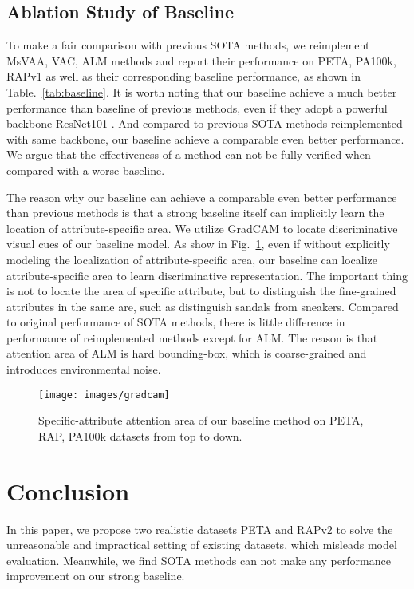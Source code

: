 \documentclass[runningheads]{llncs}
\begin{document}
\subsection{Ablation Study of Baseline}
To make a fair comparison with previous SOTA methods, we reimplement MsVAA, VAC, ALM methods and report their performance on PETA, PA100k, RAPv1 as well as their corresponding baseline performance, as shown in Table.~\ref{tab:baseline}. It is worth noting that our baseline achieve a much better performance than baseline of previous methods, even if they adopt a powerful backbone ResNet101 \cite{he2016deep}. And compared to previous SOTA methods reimplemented with same backbone, our baseline achieve a comparable even better performance. We argue that the effectiveness of a method can not be fully verified when compared with a worse baseline. 

The reason why our baseline can achieve a comparable even better performance than previous methods is that a strong baseline itself can implicitly learn the location of attribute-specific area. We utilize GradCAM \cite{selvaraju2017grad} to locate discriminative visual cues of our baseline model. As show in Fig.~\ref{fig:attention}, even if without explicitly modeling the localization of attribute-specific area, our baseline can localize attribute-specific area to learn discriminative representation. The important thing is not to locate the area of specific attribute, but to distinguish the fine-grained attributes in the same are, such as  distinguish sandals from sneakers. Compared to original performance of SOTA methods, there is little difference in performance of reimplemented methods except for ALM. The reason is that attention area of ALM is hard bounding-box, which is coarse-grained and introduces environmental noise.

\begin{figure}
\vspace{-1em}
\centering
\texttt{[image: images/gradcam]}
\caption{Specific-attribute attention area of our baseline method on PETA, RAP, PA100k datasets from top to down.}
\label{fig:attention}
\vspace{-1em}
\end{figure}



\section{Conclusion} \label{conclusion}
In this paper, we propose two realistic datasets PETA\textsubscript{} and RAPv2\textsubscript{} to solve the unreasonable and impractical setting of existing datasets, which misleads model evaluation. Meanwhile, we find SOTA methods can not make any performance improvement on our strong baseline.

\clearpage


\end{document}
